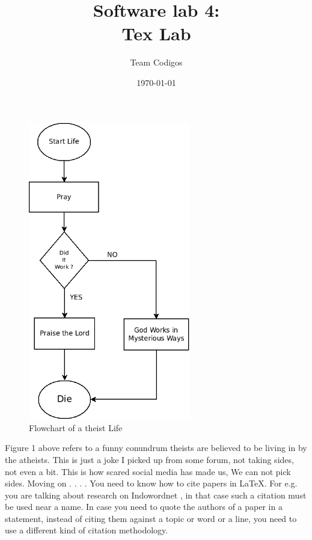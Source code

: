 \documentclass[11pt,a4paper]{article}
\begin{document}
\title{\textbf{Software lab 4: \\
{\Large Tex Lab}}}
\author{Team Codigos}
\date{\today}

\maketitle
\thispagestyle{empty}
\newpage

\thispagestyle{empty}
\newpage
\newpage
\begin{figure}[!h]
\includegraphics[width= 200pt]{LifePray.png}
\centering
\caption{Flowchart of a theist Life}
\label{fig:xyz}
\end{figure}

\qquad{} Figure 1 above refers to a funny conundrum theists are believed to be living in by the atheists. This is just a joke I picked up from some forum, not taking sides, not even a bit. This is how scared social media has made us, We can not pick sides. Moving on . . . . You need to know how to cite papers in \LaTeX{}. For e.g. you are talking about research on Indowordnet \cite{pushpak}, in that case such a citation must be used near a name. In case you need to quote the authors of a paper in a statement, instead of citing them against a topic or word or a line, you need to use a different kind of citation methodology.
\newpage
\end{document}
